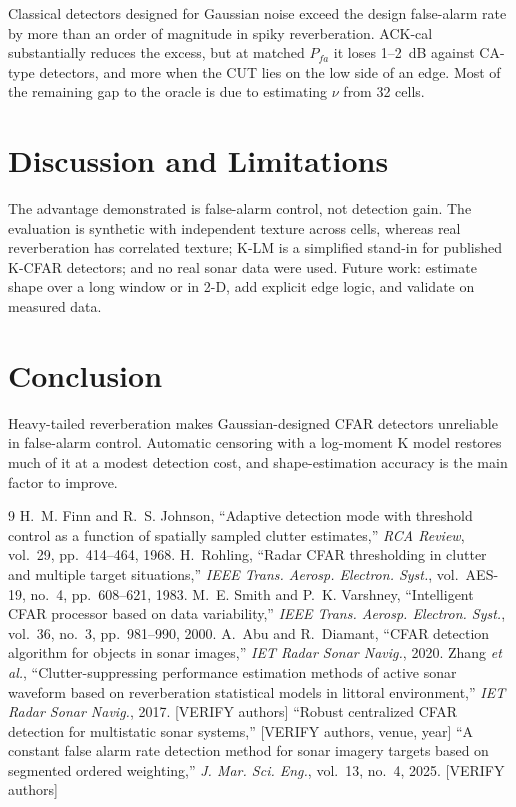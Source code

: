 \documentclass[conference]{IEEEtran}
\begin{document}
Classical detectors designed for Gaussian noise exceed the design false-alarm rate by more than an order of magnitude in spiky reverberation. ACK-cal substantially reduces the excess, but at matched $P_{fa}$ it loses 1--2~dB against CA-type detectors, and more when the CUT lies on the low side of an edge. Most of the remaining gap to the oracle is due to estimating $\nu$ from 32 cells.

\section{Discussion and Limitations}
The advantage demonstrated is false-alarm control, not detection gain. The evaluation is synthetic with independent texture across cells, whereas real reverberation has correlated texture; K-LM is a simplified stand-in for published K-CFAR detectors; and no real sonar data were used. Future work: estimate shape over a long window or in 2-D, add explicit edge logic, and validate on measured data.

\section{Conclusion}
Heavy-tailed reverberation makes Gaussian-designed CFAR detectors unreliable in false-alarm control. Automatic censoring with a log-moment K model restores much of it at a modest detection cost, and shape-estimation accuracy is the main factor to improve.

\begin{thebibliography}{9}
 H.~M. Finn and R.~S. Johnson, ``Adaptive detection mode with threshold control as a function of spatially sampled clutter estimates,'' \emph{RCA Review}, vol.~29, pp.~414--464, 1968.
 H.~Rohling, ``Radar CFAR thresholding in clutter and multiple target situations,'' \emph{IEEE Trans. Aerosp. Electron. Syst.}, vol.~AES-19, no.~4, pp.~608--621, 1983.
 M.~E. Smith and P.~K. Varshney, ``Intelligent CFAR processor based on data variability,'' \emph{IEEE Trans. Aerosp. Electron. Syst.}, vol.~36, no.~3, pp.~981--990, 2000.
 A.~Abu and R.~Diamant, ``CFAR detection algorithm for objects in sonar images,'' \emph{IET Radar Sonar Navig.}, 2020.
 Zhang \emph{et al.}, ``Clutter-suppressing performance estimation methods of active sonar waveform based on reverberation statistical models in littoral environment,'' \emph{IET Radar Sonar Navig.}, 2017. [VERIFY authors]
 ``Robust centralized CFAR detection for multistatic sonar systems,'' [VERIFY authors, venue, year]
 ``A constant false alarm rate detection method for sonar imagery targets based on segmented ordered weighting,'' \emph{J. Mar. Sci. Eng.}, vol.~13, no.~4, 2025. [VERIFY authors]
\end{thebibliography}
\end{document}
